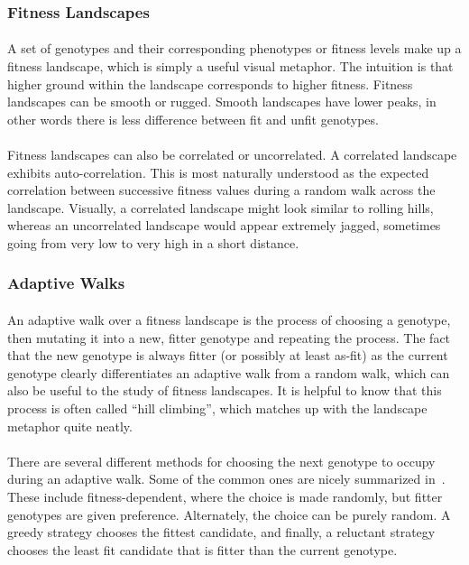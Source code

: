 \documentclass[12pt,letterpaper,titlepage,draft]{article}
\begin{document}
\subsubsection{Fitness Landscapes}

\paragraph{}
A set of genotypes and their corresponding phenotypes or fitness levels make up
a fitness landscape, which is simply a useful visual metaphor. The intuition is
that higher ground within the landscape corresponds to higher fitness. Fitness
landscapes can be smooth or rugged. Smooth landscapes have lower peaks, in
other words there is less difference between fit and unfit genotypes.

\paragraph{}
Fitness landscapes can also be correlated or uncorrelated. A correlated
landscape exhibits auto-correlation. This is most naturally understood as the
expected correlation between successive fitness values during a random walk
across the landscape. Visually, a correlated landscape might look similar to
rolling hills, whereas an uncorrelated landscape would appear extremely jagged,
sometimes going from very low to very high in a short distance.

\subsubsection{Adaptive Walks}

\paragraph{}
An adaptive walk over a fitness landscape is the process of choosing a
genotype, then mutating it into a new, fitter genotype and repeating the
process. The fact that the new genotype is always fitter (or possibly at least
as-fit) as the current genotype clearly differentiates an adaptive walk from a
random walk, which can also be useful to the study of fitness landscapes. It is
helpful to know that this process is often called ``hill climbing'', which
matches up with the landscape metaphor quite neatly.

\paragraph{}
There are several different methods for choosing the next genotype to occupy
during an adaptive walk. Some of the common ones are nicely summarized
in~\cite{Nowak2015}. These include fitness-dependent, where the choice is made
randomly, but fitter genotypes are given preference. Alternately, the choice
can be purely random. A greedy strategy chooses the fittest candidate, and
finally, a reluctant strategy chooses the least fit candidate that is fitter
than the current genotype.
\end{document}
